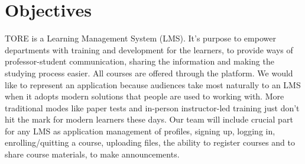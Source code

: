 \section{Objectives}

TORE is a Learning Management System (LMS). It's purpose to empower departments with training and development for the learners, to provide ways of professor-student communication, sharing the information and making the studying process easier. All courses  are offered through the platform. We would like to represent an application because audiences take most naturally to an LMS when it adopts modern solutions that people are used to working with. More traditional modes like paper tests and in-person instructor-led training just don’t hit the mark for modern learners these days. Our team will include crucial part for any LMS as application management of profiles, signing up, logging in, enrolling/quitting a course, uploading files, the ability to register courses and to share course materials, to make announcements.
